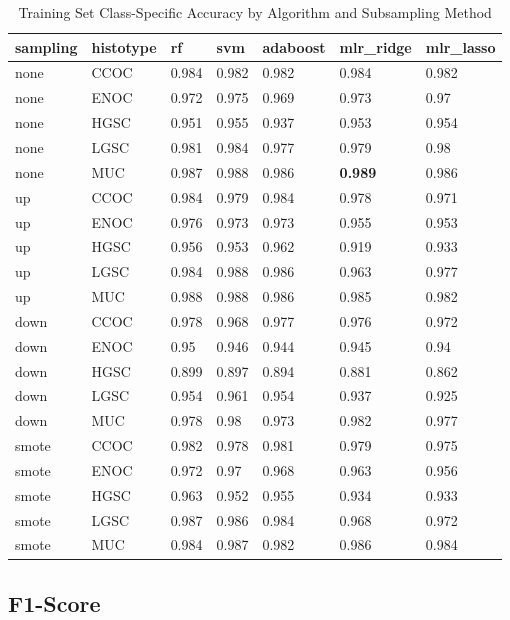 \documentclass[
]{report}
\begin{document}
\begin{table}

\caption{\label{tab:train-accuracy-class-table}Training Set Class-Specific Accuracy by Algorithm and Subsampling Method}
\centering
\begin{tabular}[t]{l|l|l|l|l|l|l}
\hline
sampling & histotype & rf & svm & adaboost & mlr\_ridge & mlr\_lasso\\
\hline
none & CCOC & 0.984 & 0.982 & 0.982 & 0.984 & 0.982\\
\hline
none & ENOC & 0.972 & 0.975 & 0.969 & 0.973 & 0.97\\
\hline
none & HGSC & 0.951 & 0.955 & 0.937 & 0.953 & 0.954\\
\hline
none & LGSC & 0.981 & 0.984 & 0.977 & 0.979 & 0.98\\
\hline
none & MUC & 0.987 & 0.988 & 0.986 & \textbf{0.989} & 0.986\\
\hline
up & CCOC & 0.984 & 0.979 & 0.984 & 0.978 & 0.971\\
\hline
up & ENOC & 0.976 & 0.973 & 0.973 & 0.955 & 0.953\\
\hline
up & HGSC & 0.956 & 0.953 & 0.962 & 0.919 & 0.933\\
\hline
up & LGSC & 0.984 & 0.988 & 0.986 & 0.963 & 0.977\\
\hline
up & MUC & 0.988 & 0.988 & 0.986 & 0.985 & 0.982\\
\hline
down & CCOC & 0.978 & 0.968 & 0.977 & 0.976 & 0.972\\
\hline
down & ENOC & 0.95 & 0.946 & 0.944 & 0.945 & 0.94\\
\hline
down & HGSC & 0.899 & 0.897 & 0.894 & 0.881 & 0.862\\
\hline
down & LGSC & 0.954 & 0.961 & 0.954 & 0.937 & 0.925\\
\hline
down & MUC & 0.978 & 0.98 & 0.973 & 0.982 & 0.977\\
\hline
smote & CCOC & 0.982 & 0.978 & 0.981 & 0.979 & 0.975\\
\hline
smote & ENOC & 0.972 & 0.97 & 0.968 & 0.963 & 0.956\\
\hline
smote & HGSC & 0.963 & 0.952 & 0.955 & 0.934 & 0.933\\
\hline
smote & LGSC & 0.987 & 0.986 & 0.984 & 0.968 & 0.972\\
\hline
smote & MUC & 0.984 & 0.987 & 0.982 & 0.986 & 0.984\\
\hline
\end{tabular}
\end{table}

\hypertarget{f1-score}{%
\subsection{F1-Score}\label{f1-score}}
\end{document}
